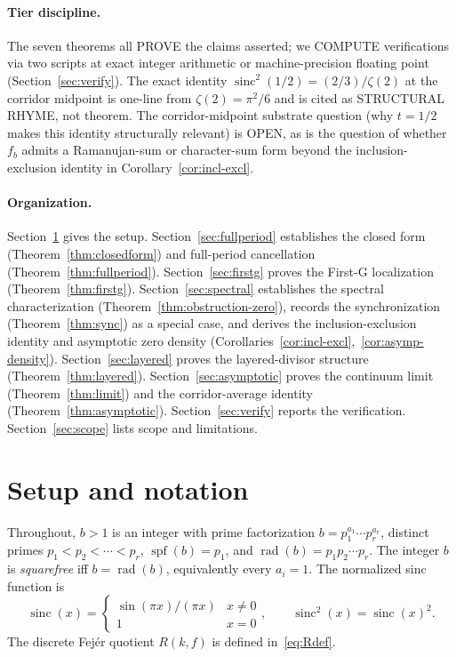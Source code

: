 \documentclass[11pt,reqno]{amsart}
\theoremstyle{plain}
\theoremstyle{definition}
\theoremstyle{remark}
\DeclareMathOperator{\spf}{spf}
\DeclareMathOperator{\sinc}{sinc}
\DeclareMathOperator{\rad}{rad}
\begin{document}
\paragraph{Tier discipline.} The seven theorems all PROVE the claims
asserted; we COMPUTE verifications via two scripts at exact integer
arithmetic or machine-precision floating point (Section~\ref{sec:verify}).
The exact identity $\sinc^{2}(1/2) = (2/3)/\zeta(2)$ at the corridor
midpoint is one-line from $\zeta(2) = \pi^{2}/6$ and is cited as
STRUCTURAL RHYME, not theorem. The corridor-midpoint substrate
question (why $t = 1/2$ makes this identity structurally relevant) is
OPEN, as is the question of whether $f_{b}$ admits a Ramanujan-sum or
character-sum form beyond the inclusion-exclusion identity in
Corollary~\ref{cor:incl-excl}.

\paragraph{Organization.} Section~\ref{sec:setup} gives the setup.
Section~\ref{sec:fullperiod} establishes the closed form
(Theorem~\ref{thm:closedform}) and full-period cancellation
(Theorem~\ref{thm:fullperiod}). Section~\ref{sec:firstg} proves the
First-G localization (Theorem~\ref{thm:firstg}).
Section~\ref{sec:spectral} establishes the spectral characterization
(Theorem~\ref{thm:obstruction-zero}), records the synchronization
(Theorem~\ref{thm:sync}) as a special case, and derives the
inclusion-exclusion identity and asymptotic zero density
(Corollaries~\ref{cor:incl-excl},~\ref{cor:asymp-density}).
Section~\ref{sec:layered} proves the layered-divisor structure
(Theorem~\ref{thm:layered}). Section~\ref{sec:asymptotic} proves the
continuum limit (Theorem~\ref{thm:limit}) and the corridor-average
identity (Theorem~\ref{thm:asymptotic}). Section~\ref{sec:verify}
reports the verification. Section~\ref{sec:scope} lists scope and
limitations.

\section{Setup and notation}\label{sec:setup}

Throughout, $b > 1$ is an integer with prime factorization
$b = p_{1}^{a_{1}} \cdots p_{r}^{a_{r}}$, distinct primes
$p_{1} < p_{2} < \cdots < p_{r}$, $\spf(b) = p_{1}$, and
$\rad(b) = p_{1} p_{2} \cdots p_{r}$. The integer $b$ is
\emph{squarefree} iff $b = \rad(b)$, equivalently every $a_{i} = 1$.
The normalized sinc function is
\[
  \sinc(x) =
  \begin{cases}
    \sin(\pi x)/(\pi x) & x \ne 0 \\
    1 & x = 0
  \end{cases},
  \qquad
  \sinc^{2}(x) = \sinc(x)^{2}.
\]
The discrete Fej\'{e}r quotient $R(k, f)$ is defined in~\eqref{eq:Rdef}.
\end{document}
